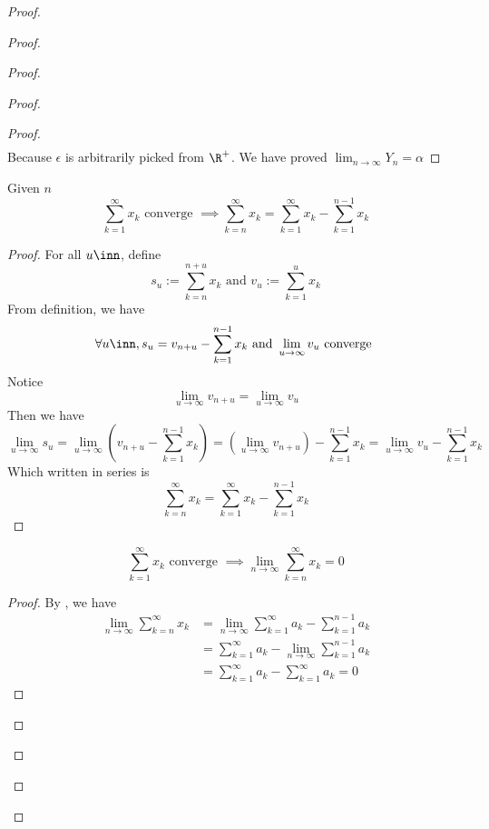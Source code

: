 \documentclass{report}
\begin{document}
\begin{proof}
\begin{proof}
\begin{proof}
\begin{proof}
\begin{proof}
\begin{align*}
\end{align*}
Because $\epsilon $ is arbitrarily picked from $\R^+$. We have proved  $\lim_{n\to\infty}Y_n=\alpha $
\end{proof}
\begin{lemma}
\label{8.4.2}
Given $n$
\begin{equation*}
  \sum_{k=1}^\infty x_k\text{ converge }\implies \sum_{k=n}^\infty x_k=\sum_{k=1}^\infty x_k-\sum_{k=1}^{n-1}x_k
\end{equation*}
\end{lemma}
\begin{proof}
For all $u\inn$, define 
\begin{equation*}
s_u:=\sum_{k=n}^{n+u}x_k\text{ and }v_u:=\sum_{k=1}^{u}x_k
\end{equation*}
From definition, we have
\begin{equation*}
  \forall u\inn,s_u=v_{n+u}-\sum_{k=1}^{n-1}x_k\text{ and }\lim_{u\to\infty}v_u\text{ converge }
\end{equation*}
Notice 
\begin{equation*}
\lim_{u\to\infty}v_{n+u}=\lim_{u\to\infty}v_u
\end{equation*}
Then we have
\begin{equation*}
\lim_{u\to\infty}s_u=\lim_{u\to\infty} (v_{n+u}-\sum_{k=1}^{n-1}x_k)=(\lim_{u\to\infty}v_{n+u})-\sum_{k=1}^{n-1}x_k=\lim_{u\to\infty}v_u-\sum_{k=1}^{n-1}x_k
\end{equation*}
Which written in series is
\begin{equation*}
\sum_{k=n}^{\infty} x_k=\sum_{k=1}^\infty x_k-\sum_{k=1}^{n-1}x_k
\end{equation*}
\end{proof}
\begin{lemma}
\label{8.4.3}
\begin{equation*}
\sum_{k=1}^\infty x_k\text{ converge }\implies \lim_{n\to\infty}\sum_{k=n}^\infty x_k=0
\end{equation*}
\end{lemma}
\begin{proof} 
By , we have
\begin{align*}
  \lim_{n\to\infty}\sum_{k=n}^\infty x_k&=\lim_{n\to\infty}\sum_{k=1}^\infty a_k-\sum_{k=1}^{n-1}a_k\\
  &=\sum_{k=1}^\infty a_k-\lim_{n\to\infty}\sum_{k=1}^{n-1}a_k\\
  &=\sum_{k=1}^\infty a_k-\sum_{k=1}^\infty a_k=0
\end{align*}
\end{proof}

\end{proof}
\end{proof}
\end{proof}
\end{proof}
\end{document}
